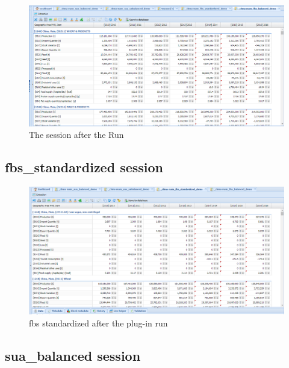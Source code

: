 \documentclass[]{article}
\begin{document}
\begin{figure}[H]

{\centering \includegraphics[width=1\linewidth]{images/standPlugin/35_finalSession} 

}

\caption{\label{fig:f35}The session after the Run}\label{fig:f35}
\end{figure}

\subsection{fbs\_standardized session}\label{fbs_standardized-session}

\begin{figure}[H]

{\centering \includegraphics[width=1\linewidth]{images/standPlugin/37_fbsStandAfter} 

}

\caption{\label{fig:f36}fbs standardized after the plug-in run}\label{fig:f36}
\end{figure}

\subsection{sua\_balanced session}\label{sua_balanced-session}
\end{document}
